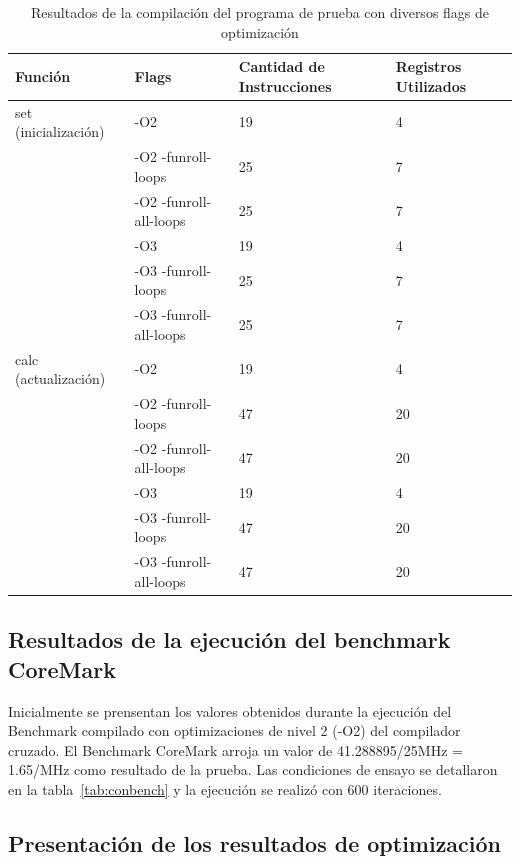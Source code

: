 \begin{table}[!h]
		\centering
		\begin{tabular}{ | p{4cm} | p{5cm} | p{2.5cm} | p{2cm} | }
		\hline 
		\rowcolor[gray]{0.8} Función & Flags & Cantidad de Instrucciones  & Registros Utilizados \\    
		\hline 
		set (inicialización) 	& -O2 						& 19 &  4 \\ 
		\hline 
							 	& -O2 -funroll-loops 		& 25 &  7 \\ 
		\hline 
							 	& -O2 -funroll-all-loops 	& 25 &  7 \\ 
		\hline 
							 	& -O3 						& 19 &  4 \\ 
		\hline 
							 	& -O3 -funroll-loops 		& 25 &  7 \\ 
		\hline 
							 	& -O3 -funroll-all-loops 	& 25 &  7 \\ 
		\hline 
		calc (actualización) 	& -O2						& 19 &  4 \\ 
		\hline 
							 	& -O2 -funroll-loops 		& 47 &  20 \\ 
		\hline 
							 	& -O2 -funroll-all-loops 	& 47 &  20 \\ 		
		\hline					 	
							 	& -O3 						& 19 &  4 \\ 
		\hline 
							 	& -O3 -funroll-loops 		& 47 &  20 \\ 
		\hline 
							 	& -O3 -funroll-all-loops 	& 47 &  20 \\ 		
		\hline 
		\end{tabular}
\caption{Resultados de la compilación del programa de prueba con diversos flags de optimización}
\end{table}	



		\subsection{Resultados de la ejecución del benchmark CoreMark}
		
Inicialmente se prensentan los valores obtenidos durante la ejecución del Benchmark compilado con optimizaciones de nivel 2 (-O2) del
compilador cruzado. El Benchmark CoreMark arroja un valor de  41.288895/25MHz = 1.65/MHz como resultado de la prueba. Las condiciones de ensayo se
detallaron en la tabla~\ref{tab:conbench} y la ejecución se realizó con 600 iteraciones. 


	\subsection {Presentación de los resultados de optimización} 

